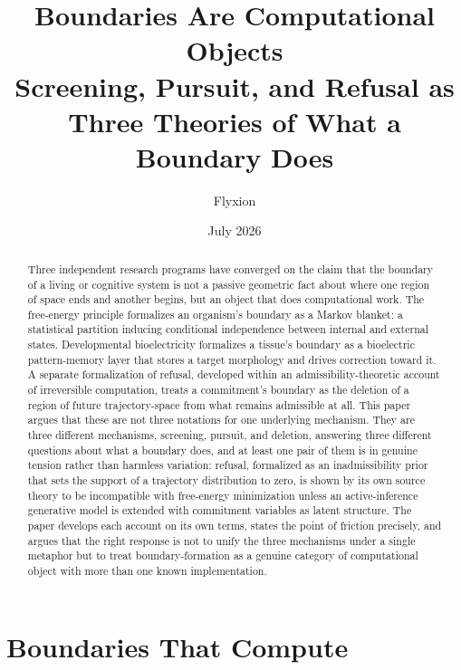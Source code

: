 \documentclass[11pt]{article}
\title{\textbf{Boundaries Are Computational Objects}\\[0.3em]
\large Screening, Pursuit, and Refusal as Three Theories of What a Boundary Does}
\author{Flyxion}
\date{July 2026}
\theoremstyle{plain}
\begin{document}
\maketitle

\begin{abstract}
\noindent
Three independent research programs have converged on the claim that the boundary of a living or cognitive system is not a passive geometric fact about where one region of space ends and another begins, but an object that does computational work. The free-energy principle formalizes an organism's boundary as a Markov blanket: a statistical partition inducing conditional independence between internal and external states. Developmental bioelectricity formalizes a tissue's boundary as a bioelectric pattern-memory layer that stores a target morphology and drives correction toward it. A separate formalization of refusal, developed within an admissibility-theoretic account of irreversible computation, treats a commitment's boundary as the deletion of a region of future trajectory-space from what remains admissible at all. This paper argues that these are not three notations for one underlying mechanism. They are three different mechanisms, screening, pursuit, and deletion, answering three different questions about what a boundary does, and at least one pair of them is in genuine tension rather than harmless variation: refusal, formalized as an inadmissibility prior that sets the support of a trajectory distribution to zero, is shown by its own source theory to be incompatible with free-energy minimization unless an active-inference generative model is extended with commitment variables as latent structure. The paper develops each account on its own terms, states the point of friction precisely, and argues that the right response is not to unify the three mechanisms under a single metaphor but to treat boundary-formation as a genuine category of computational object with more than one known implementation.
\end{abstract}

\newpage
\tableofcontents
\bigskip

\section{Boundaries That Compute}
\end{document}
